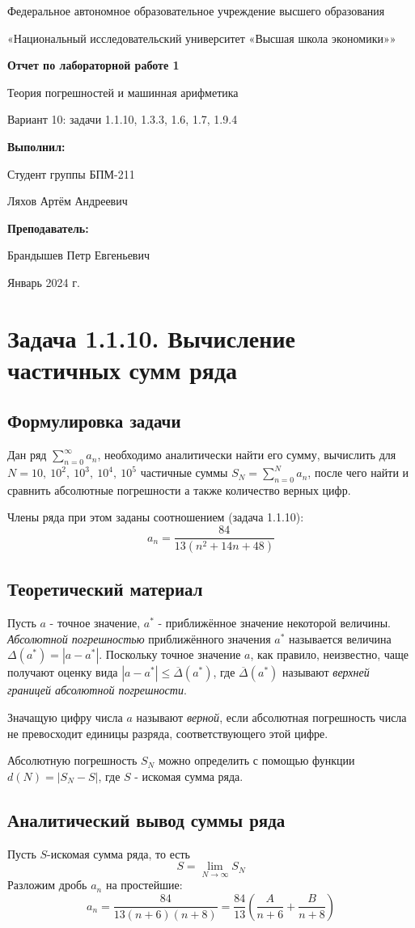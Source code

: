 \documentclass[12pt]{article}%
\date{}{Январь 2024 г.}
\newcommand*{\Title}{\begingroup
\centering 

\large {Федеральное автономное образовательное учреждение высшего образования}
\vspace*{\baselineskip}

\large {«Национальный исследовательский университет «Высшая школа экономики»»}
\vspace*{\baselineskip}

\vspace*{\baselineskip}
\large{\textbf{Отчет по лабораторной работе 1}}

\vspace{0.1cm}
\large{Теория погрешностей и машинная арифметика}

\vspace{0.2cm}
\large{Вариант 10: задачи 1.1.10, 1.3.3, 1.6, 1.7, 1.9.4}

\vspace{1.5cm} 

\begin{flushright}
  \textbf{\normalsize Выполнил:}
  
  \vspace{0.3cm} 
  {\normalsize Студент группы БПМ-211}
  
  {\normalsize Ляхов Артём Андреевич}

\end{flushright}


\vspace{0.2cm}  
\begin{flushright}
  \textbf{\normalsize Преподаватель:} 

  \vspace{0.2cm}

 {\normalsize Брандышев Петр Евгеньевич}
 
\end{flushright}

\vfill
\date{}{Январь 2024 г.}



\endgroup\clearpage}
\begin{document}
\Title
\tableofcontents
\newpage
\section{Задача 1.1.10. Вычисление частичных сумм ряда}
\subsection{Формулировка задачи}
Дан ряд $\sum\limits_{n=0}^{\infty} a_n$, необходимо аналитически найти его сумму, вычислить для $N = 10,\ 10^2,\ 10^3,\ 10^4,\ 10^5$  частичные суммы $S_N = \sum\limits_{n=0}^{N} a_n$, после чего найти и сравнить абсолютные погрешности а также количество верных цифр.

Члены ряда при этом заданы соотношением (задача 1.1.10):
\begin{equation*}
    a_n = \frac{84}{13(n^2 + 14n + 48)}
\end{equation*}

\subsection{Теоретический материал}
Пусть $a$ - точное значение, $a^{*}$ - приближённое значение некоторой величины. \textit{Абсолютной погрешностью} приближённого значения $a^{*}$ называется величина $\Delta(a^{*}) = |a - a^{*}|$. Поскольку точное значение $a$, как правило, неизвестно, чаще получают оценку вида $|a - a^{*}| \leqslant \overline{\Delta}(a^{*})$, где $\overline{\Delta}(a^{*})$ называют \textit{верхней границей абсолютной погрешности}.

Значащую цифру числа $a$ называют \textit{верной}, если абсолютная погрешность числа не превосходит единицы разряда, соответствующего этой цифре.

Абсолютную погрешность $S_N$ можно определить с помощью функции $d(N) = |S_N - S|$, где $S$ - искомая сумма ряда. 

\subsection{Аналитический вывод суммы ряда}
Пусть $S$-искомая сумма ряда, то есть
\begin{equation*}
S = \lim\limits_{N \rightarrow \infty} S_N
\end{equation*}
Разложим дробь $a_n$ на простейшие:
\begin{equation*}
a_n = \frac{84}{13(n + 6)(n + 8)} = \frac{84}{13}\left(\frac{A}{n + 6} + \frac{B}{n + 8} \right)
\end{equation*}
\end{document}
